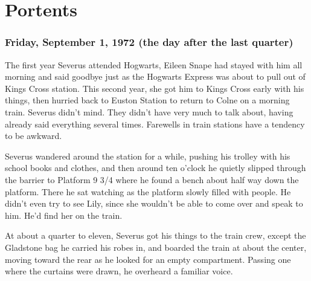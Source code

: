 
\chapter{Portents}


\subsection{Friday, September 1, 1972 (the day after the last quarter)}

The first year Severus attended Hogwarts, Eileen Snape had stayed with him all morning and said goodbye just as the Hogwarts Express was about to pull out of Kings Cross station. This second year, she got him to Kings Cross early with his things, then hurried back to Euston Station to return to Colne on a morning train. Severus didn't mind. They didn't have very much to talk about, having already said everything several times. Farewells in train stations have a tendency to be awkward.

Severus wandered around the station for a while, pushing his trolley with his school books and clothes, and then around ten o'clock he quietly slipped through the barrier to Platform 9 3/4 where he found a bench about half way down the platform. There he sat watching as the platform slowly filled with people. He didn't even try to see Lily, since she wouldn't be able to come over and speak to him. He'd find her on the train.

At about a quarter to eleven, Severus got his things to the train crew, except the Gladstone bag he carried his robes in, and boarded the train at about the center, moving toward the rear as he looked for an empty compartment. Passing one where the curtains were drawn, he overheard a familiar voice.

